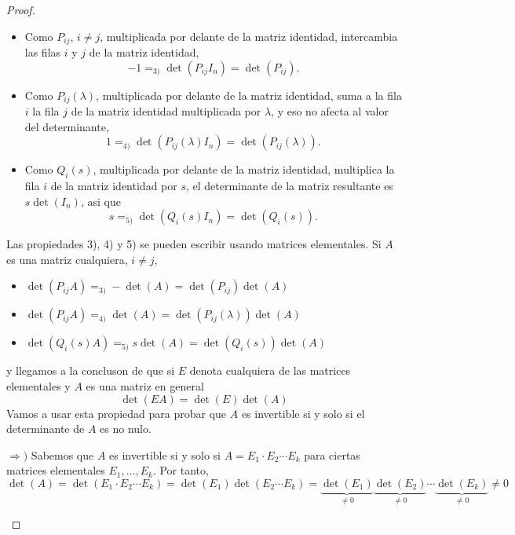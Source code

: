 \begin{proof}
\begin{enumerate}
			\begin{itemize}
				\item Como \(P_{ij}\), \(i \neq j \), multiplicada por delante de la matriz identidad, intercambia las filas \(i \) y \(j \) de la matriz identidad,
				      \[
					      -1 =_{3)} \det(P_{ij} I_n) = \det(P_{ij }).
				      \]
				\item Como \(P_{ij}(\lambda)\), multiplicada por delante de la matriz identidad, suma a la fila \(i \) la fila \(j \) de la matriz identidad multiplicada por \(\lambda \), y eso no afecta al valor del determinante,
				      \[
					      1 =_{4)} \det(P_{ij}(\lambda) I_n) = \det(P_{ij}(\lambda)).
				      \]
				\item Como \(Q_i (s )\), multiplicada por delante de la matriz identidad, multiplica la fila \(i \) de la matriz identidad por \(s \), el determinante de la matriz resultante es \(s \det(I_n )\), asi que
				      \[
					      s =_{5)} \det(Q_i(s)I_n) = \det(Q_i(s)).
				      \]
			\end{itemize}
			Las propiedades 3), 4) y 5) se pueden escribir usando matrices elementales. Si \(A \) es una matriz cualquiera, \(i \neq j \),
			\begin{itemize}
				\item \(\det(P_{ij}A ) =_{3)} -\det(A) = \det(P_{ij}) \det(A)\)
				\item \(\det(P_{ij}A) =_{4)} \det(A) = \det(P_{ij}(\lambda)) \det(A)\)
				\item \(\det(Q_i (s) A) =_{5)} s \det(A) = \det(Q_{i}(s)) \det(A )\)
			\end{itemize}
			y llegamos a la concluson de que si \(E \) denota cualquiera de las matrices elementales y \(A \) es una matriz en general
			\[
				\det(EA) = \det(E) \det(A )
			\]
			Vamos a usar esta propiedad para probar que \(A \) es invertible si y solo si el determinante de \(A \) es no nulo.

			\(\Rightarrow ) \) Sabemos que \(A \) es invertible si y solo si \(A = E_1 \cdot E_2 \cdots E_k \) para ciertas matrices elementales \(E_1, \ldots, E_k \). Por tanto,
			\[
				\det(A) = \det(E_1 \cdot E_2 \cdots E_k) = \det(E_1) \det(E_2 \cdots E_k) = \underbrace{\det(E_1)}_{\neq 0} \underbrace{\det(E_2)}_{\neq 0} \cdots \underbrace{\det(E_k)}_{\neq 0} \neq 0
			\]


\end{enumerate}
\end{proof}
